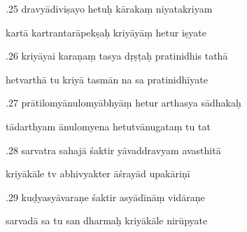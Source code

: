 \documentclass[article,12pt,a4paper]{memoir}%
\newcounter{parCount}
\begin{document}
	  
	  \pstart {}.25 dravyādiviṣayo hetuḥ kārakaṃ niyatakriyam 
	{}
	\pend%
      

	  
	  \pstart \leavevmode%
	kartā kartrantarāpekṣaḥ kriyāyāṃ hetur iṣyate 
	{}
	\pend%
      

	  
	  \pstart {}.26 kriyāyai karaṇaṃ tasya dṛṣṭaḥ pratinidhis tathā 
	{}
	\pend%
      

	  
	  \pstart \leavevmode%
	hetvarthā tu kriyā tasmān na sa pratinidhīyate 
	{}
	\pend%
      

	  
	  \pstart {}.27 prātilomyānulomyābhyāṃ hetur arthasya sādhakaḥ 
	{}
	\pend%
      

	  
	  \pstart \leavevmode%
	tādarthyam ānulomyena hetutvānugataṃ tu tat 
	{}
	\pend%
      

	  
	  \pstart {}.28 sarvatra sahajā śaktir yāvaddravyam avasthitā 
	{}
	\pend%
      

	  
	  \pstart \leavevmode%
	kriyākāle tv abhivyakter āśrayād upakāriṇī 
	{}
	\pend%
      

	  
	  \pstart {}.29 kuḍyasyāvaraṇe śaktir asyādīnāṃ vidāraṇe 
	{}
	\pend%
      

	  
	  \pstart \leavevmode%
	sarvadā sa tu san dharmaḥ kriyākāle nirūpyate 
	{}
	\pend%
      
\end{document}
